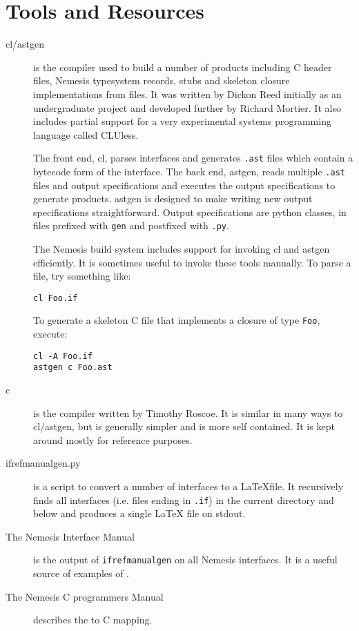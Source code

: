 \chapter{\MIDDL{} Tools and Resources}
\begin{description}

\item[cl/astgen] is the compiler used to build a number of products
including C header files, Nemesis typesystem records, stubs and
skeleton closure implementations from \MIDDL{} files. It was written by
Dickon Reed initially as an undergraduate project and developed
further by Richard Mortier. It also includes partial support for a
very experimental systems programming language called CLUless. 

The front end, cl, parses \MIDDL{} interfaces and generates {\tt .ast}
files which contain a bytecode form of the interface. The back end,
astgen, reads multiple {\tt .ast} files and output specifications and
executes the output specifications to generate products. astgen is
designed to make writing new output specifications
straightforward. Output specifications are python classes, in files
prefixed with {\tt gen} and postfixed with {\tt .py}. 

The Nemesis build system includes support for invoking cl and astgen
efficiently. It is sometimes useful to invoke these tools manually. To
parse a file, try something like:

\begin{verbatim}
cl Foo.if
\end{verbatim}

To generate a skeleton C file that implements a closure of type
{\tt Foo}, execute:

\begin{verbatim}
cl -A Foo.if
astgen c Foo.ast
\end{verbatim}

\item[\MIDDL{}c] is the compiler written by Timothy Roscoe. It is similar
in many ways to cl/astgen, but is generally simpler and is more self
contained. It is kept around mostly for reference purposes.

\item[ifrefmanualgen.py] is a script to convert a number of interfaces
to a \LaTeX file. It recursively finds all interfaces (i.e. files
ending in {\tt .if}) in the current directory and below and produces a
single LaTeX file on stdout.

\item[The Nemesis Interface Manual] is the output of {\tt ifrefmanualgen}
on all Nemesis interfaces. It is a useful source of examples of \MIDDL{}.

\item[The Nemesis C programmers Manual] describes the \MIDDL{} to C mapping.

\end{description}



